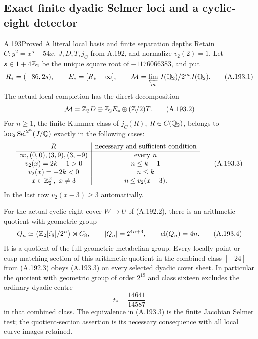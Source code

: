 \subsection{Exact finite dyadic Selmer loci and a cyclic-eight detector}

\begin{statement}{A.193}{Proved}
{A literal local basis and finite separation depths}
Retain \(C:y^2=x^5-54x\), \(J,D,T,j_C\) from A.192,
and normalize \(v_2(2)=1\).  Let \(s\in1+4\mathbb Z_2\) be the
unique square root of \(-1176066383\), and put
\[
 R_* =(-86,2s),\qquad E_*=[R_*-\infty],\qquad
 \mathcal M=\varprojlim_m J(\mathbb Q_2)/2^mJ(\mathbb Q_2).
\tag{A.193.1}
\]
The actual local completion has the direct decomposition
\[
 \mathcal M=\mathbb Z_2D\oplus\mathbb Z_2E_*\oplus(\mathbb Z/2)T.
\tag{A.193.2}
\]
For \(n\geq1\), the finite Kummer class of \(j_C(R)\),
\(R\in C(\mathbb Q_2)\), belongs to
\(\operatorname{loc}_2\operatorname{Sel}^{2^n}(J/\mathbb Q)\)
exactly in the following cases:
\[
\begin{array}{c|c}
 R&\text{necessary and sufficient condition}\\ \hline
 \infty,(0,0),(3,9),(3,-9)&\text{every }n\\
 v_2(x)=2k-1>0&n\leq k-1\\
 v_2(x)=-2k<0&n\leq k\\
 x\in\mathbb Z_2^\times,\ x\ne3&n\leq v_2(x-3).
\end{array}
\tag{A.193.3}
\]
In the last row \(v_2(x-3)\geq3\) automatically.

For the actual cyclic-eight cover \(W\to U\) of
(A.192.2), there is an arithmetic quotient with geometric group
\[
 Q_n\simeq\bigl(\mathbb Z_2[\zeta_8]/2^n\bigr)\rtimes C_8,
 \qquad |Q_n|=2^{4n+3},\qquad \operatorname{cl}(Q_n)=4n.
\tag{A.193.4}
\]
It is a quotient of the full geometric metabelian group.
Every locally point-or-cusp-matching section of this arithmetic
quotient in the combined class \([-24]\) from (A.192.3)
obeys (A.193.3) on every selected dyadic cover sheet.
In particular the quotient with geometric group of order
\(2^{19}\) and class sixteen excludes the ordinary dyadic centre
\[
                         t_* =\frac{14641}{14587}
\tag{A.193.5}
\]
in that combined class.  The equivalence in (A.193.3) is the
finite Jacobian Selmer test; the quotient-section assertion is
its necessary consequence with all local curve images retained.
\end{statement}

